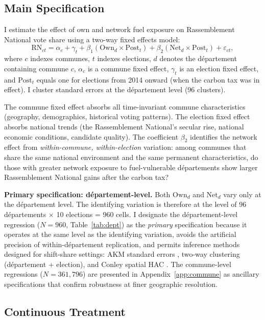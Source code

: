 \documentclass[12pt]{article}
\newcommand{\rn}{Rassemblement National}
\newcommand{\dept}{d\'{e}partement}
\newcommand{\depts}{d\'{e}partements}
\begin{document}
\subsection{Main Specification}

I estimate the effect of own and network fuel exposure on \rn{} vote share using a two-way fixed effects model:
\begin{equation}
\text{RN}_{ct} = \alpha_c + \gamma_t + \beta_1 (\text{Own}_d \times \text{Post}_t) + \beta_2 (\text{Net}_d \times \text{Post}_t) + \varepsilon_{ct},
\label{eq:main}
\end{equation}
where $c$ indexes communes, $t$ indexes elections, $d$ denotes the \dept{} containing commune $c$, $\alpha_c$ is a commune fixed effect, $\gamma_t$ is an election fixed effect, and $\text{Post}_t$ equals one for elections from 2014 onward (when the carbon tax was in effect). I cluster standard errors at the \dept{} level (96 clusters).

The commune fixed effect absorbs all time-invariant commune characteristics (geography, demographics, historical voting patterns). The election fixed effect absorbs national trends (the \rn{}'s secular rise, national economic conditions, candidate quality). The coefficient $\beta_2$ identifies the network effect from \emph{within-commune, within-election} variation: among communes that share the same national environment and the same permanent characteristics, do those with greater network exposure to fuel-vulnerable \depts{} show larger \rn{} gains after the carbon tax?

\textbf{Primary specification: \dept{}-level.} Both $\text{Own}_d$ and $\text{Net}_d$ vary only at the \dept{} level. The identifying variation is therefore at the level of 96 \depts{} $\times$ 10 elections = 960 cells. I designate the \dept{}-level regression ($N = 960$, Table~\ref{tab:dept}) as the \emph{primary} specification because it operates at the same level as the identifying variation, avoids the artificial precision of within-\dept{} replication, and permits inference methods designed for shift-share settings: AKM standard errors \citep{adao2019shift}, two-way clustering (\dept{} + election), and Conley spatial HAC \citep{conley1999gmm}. The commune-level regressions ($N = 361{,}796$) are presented in Appendix~\ref{app:commune} as ancillary specifications that confirm robustness at finer geographic resolution.

\subsection{Continuous Treatment}
\end{document}
